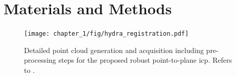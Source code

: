 

\section{Materials and Methods}
\label{c1:sec:materials_and_methods}
\begin{figure}[htb]
    \centering
    \texttt{[image: chapter\_1/fig/hydra\_registration.pdf]}
    \caption{Detailed point cloud generation and acquisition including pre-processing steps for the proposed robust point-to-plane \gls{icp}. Refers to .}
    \label{c1:fig:hydra_registration}
\end{figure}

